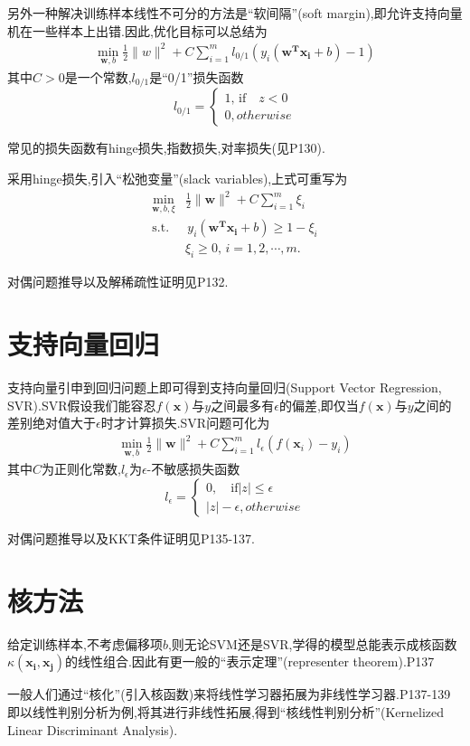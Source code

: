 另外一种解决训练样本线性不可分的方法是``软间隔''(soft margin),即允许支持向量机在一些样本上出错.因此,优化目标可以总结为
\begin{equation}\begin{split}
\min_{\mathbf w,b}\frac{1}{2}\|w\|^2+C\sum_{i=1}^ml_{0/1}(y_i(\mathbf{w^Tx_i}+b)-1)
\end{split}\end{equation}
其中$C>0$是一个常数,$l_{0/1}$是``0/1''损失函数
\begin{equation}l_{0/1}=\left\{\begin{array}{ll}
1,\,\text{if}\quad z<0\\
0,otherwise
\end{array}\right.\end{equation}

常见的损失函数有hinge损失,指数损失,对率损失(见P130).

采用hinge损失,引入``松弛变量''(slack variables),上式可重写为
\begin{equation}\begin{split}
\min_{\mathbf w,b,\xi}&\frac{1}{2}\|\mathbf w\|^2+C\sum_{i=1}^m\xi_i\\
\text{s.t.}&\,y_i(\mathbf{w^Tx_i}+b)\ge1-\xi_i\\
&\xi_i\ge0,\,i=1,2,\cdots,m.
\end{split}\end{equation}

对偶问题推导以及解稀疏性证明见P132.

\section{支持向量回归}

支持向量引申到回归问题上即可得到支持向量回归(Support Vector Regression, SVR).SVR假设我们能容忍$f(\mathbf x)$与$y$之间最多有$\epsilon$的偏差,即仅当$f(\mathbf x)$与$y$之间的差别绝对值大于$\epsilon$时才计算损失.SVR问题可化为
\begin{equation}\begin{split}
\min_{\mathbf w,b}\frac{1}{2}\|\mathbf w\|^2+C\sum_{i=1}^ml_\epsilon(f(\mathbf x_i)-y_i)
\end{split}\end{equation}
其中$C$为正则化常数,$l_\epsilon$为$\epsilon$-不敏感损失函数
\begin{equation}l_\epsilon=\left\{\begin{array}{ll}
0,\quad\text{if}|z|\le\epsilon\\
|z|-\epsilon,otherwise
\end{array}\right.\end{equation}

对偶问题推导以及KKT条件证明见P135-137.

\section{核方法}

给定训练样本,不考虑偏移项$b$,则无论SVM还是SVR,学得的模型总能表示成核函数$\kappa(\mathbf{x_i,x_j})$的线性组合.因此有更一般的``表示定理''(representer theorem).P137

一般人们通过``核化''(引入核函数)来将线性学习器拓展为非线性学习器.P137-139即以线性判别分析为例,将其进行非线性拓展,得到``核线性判别分析''(Kernelized Linear Discriminant Analysis).